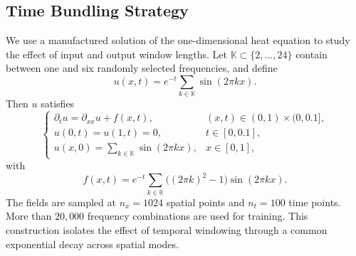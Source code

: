 \documentclass[preprint,numbers,sort&compress]{elsarticle}
\begin{document}
			
			\subsection{Time Bundling Strategy}  
			We use a manufactured solution of the one-dimensional heat
			equation to study the effect of input and output window lengths.
			Let $\mathbb K\subset\{2,\ldots,24\}$ contain between one and
			six randomly selected frequencies, and define
			\[
			u(x,t)
			=
			e^{-t}\sum_{k\in\mathbb K}\sin(2\pi kx).
			\]
			Then $u$ satisfies
			\[
			\begin{cases}
				\partial_t u=\partial_{xx}u+f(x,t),
				& (x,t)\in(0,1)\times(0,0.1],\\
				u(0,t)=u(1,t)=0,
				& t\in[0,0.1],\\
				u(x,0)=\displaystyle\sum_{k\in\mathbb K}\sin(2\pi kx),
				& x\in[0,1],
			\end{cases}
			\]
			with
			\[
			f(x,t)
			=
			e^{-t}\sum_{k\in\mathbb K}
			\bigl((2\pi k)^2-1\bigr)\sin(2\pi kx).
			\]
			The fields are sampled at $n_x=1024$ spatial points and
			$n_t=100$ time points. More than $20{,}000$ frequency
			combinations are used for training.
			This construction isolates the effect of temporal windowing
			through a common exponential decay across spatial modes.
			
\end{document}
